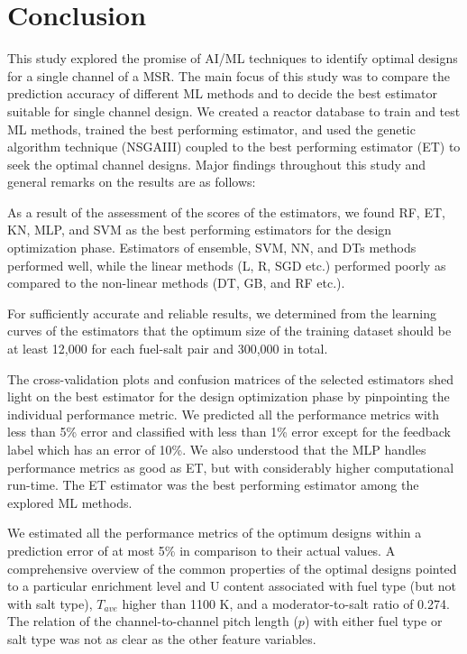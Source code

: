 \section{Conclusion}

    This study explored the promise of \gls{AI}/\gls{ML} techniques to identify optimal designs for a single channel of a \gls{MSR}. The main focus of this study was to compare the prediction accuracy of different \gls{ML} methods and to decide the best estimator suitable for single channel design. We created a reactor database to train and test \gls{ML} methods, trained the best performing estimator, and used the genetic algorithm technique (\gls{NSGAIII}) coupled to the best performing estimator (\gls{ET}) to seek the optimal channel designs. Major findings throughout this study and general remarks on the results are as follows:

    As a result of the assessment of the scores of the estimators, we found \gls{RF}, \gls{ET}, \gls{KN}, \gls{MLP}, and \gls{SVM} as the best performing estimators for the design optimization phase. Estimators of ensemble, \gls{SVM}, \gls{NN}, and \gls{DTs} methods performed well, while the linear methods (L, R, SGD etc.) performed poorly as compared to the non-linear methods (\gls{DT}, \gls{GB}, and \gls{RF} etc.).

    For sufficiently accurate and reliable results, we determined from the learning curves of the estimators that the optimum size of the training dataset should be at least 12,000 for each fuel-salt pair and 300,000 in total.

    The cross-validation plots and confusion matrices of the selected estimators shed light on the best estimator for the design optimization phase by pinpointing the individual performance metric. We predicted all the performance metrics with less than 5\% error and classified with less than 1\% error except for the feedback label which has an error of 10\%. We also understood that the \gls{MLP} handles performance metrics as good as \gls{ET}, but with considerably higher computational run-time. The \gls{ET} estimator was the best performing estimator among the explored \gls{ML} methods.

    We estimated all the performance metrics of the optimum	designs within a prediction error of at most 5\% in comparison to their actual values. A comprehensive overview of the common properties of the optimal designs pointed to a particular enrichment level and U content	associated with fuel type (but not with salt type), $T_{ave}$ higher than 1100 K, and a moderator-to-salt ratio of 0.274. The relation of the channel-to-channel pitch length ($p$) with either fuel type or salt type was not as clear as the other feature variables.

